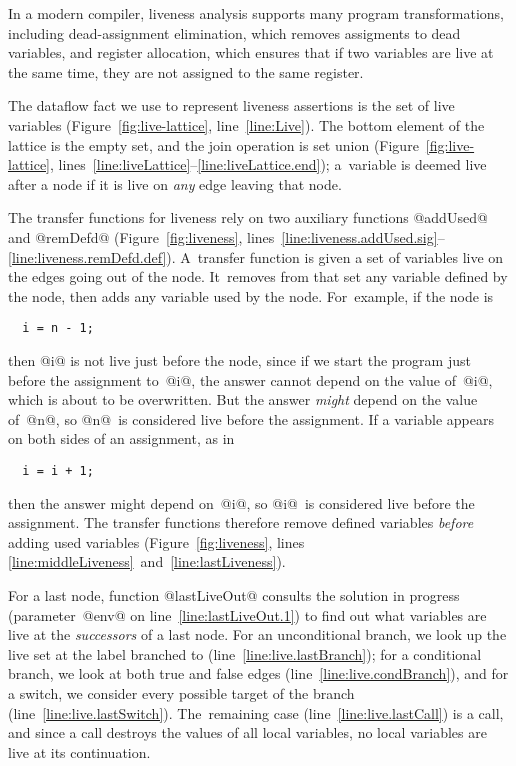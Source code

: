\documentclass[blockstyle,preprint,natbib,nocopyrightspace]{sigplanconf}
\newcommand\lineref[1]{line~\ref{line:#1}}
\newcommand\linepairref[2]{lines \ref{line:#1}~and~\ref{line:#2}}
\newcommand\linerangeref[2]{\mbox{lines~\ref{line:#1}--\ref{line:#2}}}
\newcommand\figref[1]{Figure~\ref{fig:#1}}
\begin{document}
In a modern compiler, liveness analysis supports many program
transformations,
including
dead-assignment elimination,
which removes assigments to dead variables, 
and register allocation, which
ensures that if two variables are 
live at the same time, they are not assigned to the same register. 

The dataflow fact we use to represent liveness assertions is the set of
live variables (\figref{live-lattice}, \lineref{Live}).
The bottom element of the lattice is the empty set, and the join
operation is set union (\figref{live-lattice},
\linerangeref{liveLattice}{liveLattice.end}); 
a~variable is deemed live after a node if it is live on \emph{any} edge leaving that
node.

The transfer functions for liveness rely on two auxiliary functions
@addUsed@ and @remDefd@ (\figref{liveness}, 
\linerangeref{liveness.addUsed.sig}{liveness.remDefd.def}).
A~transfer function is given a set of variables live on the edges
going out of the node.
It~removes from that set any variable
defined by the node, then adds any variable used by the
node.
For~example, if the node is
\begin{verbatim}
  i = n - 1;
\end{verbatim}
then @i@ is not live just before the node, since if we start the
program just before the assignment to~@i@, the answer cannot 
depend on the value of~@i@, which is about to be overwritten.
But the answer \emph{might} depend on the value of~@n@, so
@n@~is considered live before the assignment.
If a variable appears on both sides of an
assignment, as in \ifpagetuning{\looseness=-1 \par}\fi
\begin{verbatim}
  i = i + 1;
\end{verbatim}
then the answer might depend on~@i@, so @i@~is considered live
before the assignment.
The transfer functions
therefore
remove defined variables \emph{before} adding used variables
(\figref{liveness}, \linepairref{middleLiveness}{lastLiveness}). 

For a last node, function @lastLiveOut@ consults the solution in
progress (parameter~@env@ on \lineref{lastLiveOut.1}) to find out what
variables are live at the \emph{successors} of a 
last node. 
For an unconditional branch, we look up the live set at the label
branched to (\lineref{live.lastBranch});
for a conditional branch, we look at both true and false edges
(\lineref{live.condBranch}), 
 and
for a switch, we consider every possible target of the
branch (\lineref{live.lastSwitch}).
The~remaining case (\lineref{live.lastCall}) is a call, 
and since a call destroys the values of all local variables, no
local variables are live at its continuation.
\end{document}
